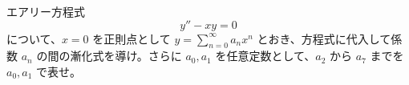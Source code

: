 
エアリー方程式
\[
y'' - x y = 0
\]
について、$x=0$ を正則点として $y = \displaystyle\sum_{n=0}^{\infty} a_n x^{n}$ とおき、方程式に代入して係数 $a_n$ の間の漸化式を導け。さらに $a_0, a_1$ を任意定数として、$a_2$ から $a_7$ までを $a_0, a_1$ で表せ。
